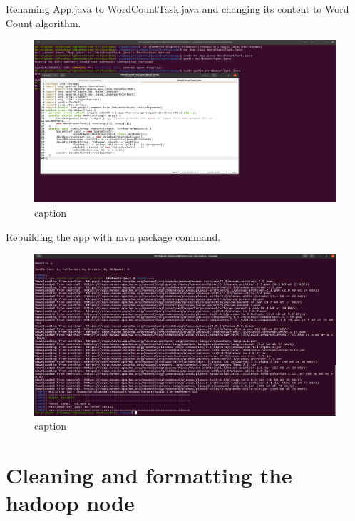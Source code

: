 \begin{spacing}{1.2}
\par Renaming App.java to WordCountTask.java and changing its content to Word Count algorithm.
\\
\begin{figure}[!htb] 
\begin{center} 
\includegraphics[width=1\linewidth]{Big_Data/Spark/Running a Spark Batch app in Java/WordCountTask.java.jpg} 
\end{center} 
\caption{caption} 
\end{figure} 
\FloatBarrier

\par Rebuilding the app with mvn package command.
\\
\begin{figure}[!htb] 
\begin{center} 
\includegraphics[width=1\linewidth]{Big_Data/Spark/Running a Spark Batch app in Java/Build with WordCount.jpg} 
\end{center} 
\caption{caption} 
\end{figure} 
\FloatBarrie

\section{Cleaning and formatting the hadoop node}


\end{spacing}
